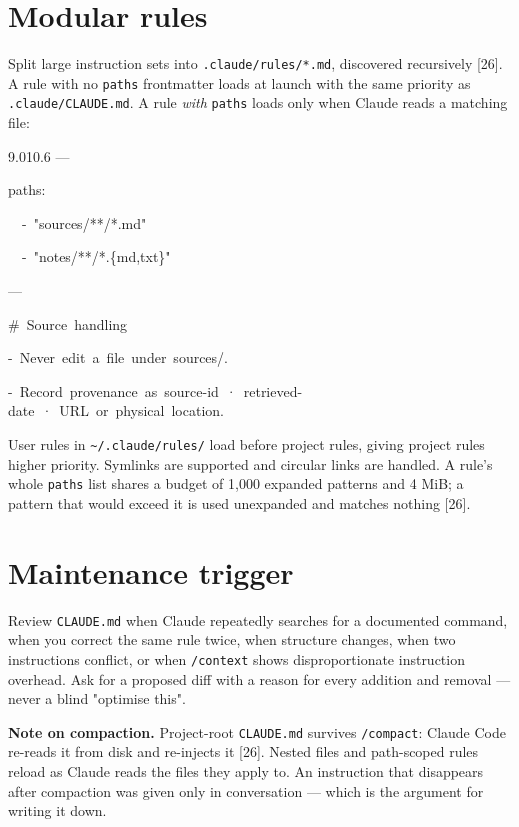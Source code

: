 \documentclass[11pt,a4paper,twoside,openany]{book}
\newcommand{\cl}[1]{\noindent\mbox{#1}\par}
\begin{document}
\FloatBarrier
\setcounter{section}{4}
\section{Modular rules}

Split large instruction sets into \texttt{.\allowbreak{}claude/\allowbreak{}rules/\allowbreak{}*.\allowbreak{}md}, discovered recursively [26]. A rule with no \texttt{paths} frontmatter loads at launch with the same priority as \texttt{.\allowbreak{}claude/\allowbreak{}CLAUDE.\allowbreak{}md}. A rule \emph{with} \texttt{paths} loads only when Claude reads a matching file:


\begin{codeblock}{9.0}{10.6}
\cl{---}
\cl{paths:}
\cl{~~-~"sources/**/*.md"}
\cl{~~-~"notes/**/*.\{md,txt\}"}
\cl{---}
\cl{}
\cl{\#~Source~handling}
\cl{}
\cl{-~Never~edit~a~file~under~\textasciigrave{}sources/\textasciigrave{}.}
\cl{-~Record~provenance~as~\textasciigrave{}source-id~·~retrieved-date~·~URL~or~physical~location\textasciigrave{}.}
\end{codeblock}

User rules in \texttt{\textasciitilde{}/\allowbreak{}.\allowbreak{}claude/\allowbreak{}rules/\allowbreak{}} load before project rules, giving project rules higher priority. Symlinks are supported and circular links are handled. A rule's whole \texttt{paths} list shares a budget of 1,000 expanded patterns and 4 MiB; a pattern that would exceed it is used unexpanded and matches nothing [26].


\FloatBarrier
\setcounter{section}{5}
\section{Maintenance trigger}

Review \texttt{CLAUDE.\allowbreak{}md} when Claude repeatedly searches for a documented command, when you correct the same rule twice, when structure changes, when two instructions conflict, or when \texttt{/\allowbreak{}context} shows disproportionate instruction overhead. Ask for a proposed diff with a reason for every addition and removal — never a blind "optimise this".


\textbf{Note on compaction.} Project-root \texttt{CLAUDE.\allowbreak{}md} survives \texttt{/\allowbreak{}compact}: Claude Code re-reads it from disk and re-injects it [26]. Nested files and path-scoped rules reload as Claude reads the files they apply to. An instruction that disappears after compaction was given only in conversation — which is the argument for writing it down.
\end{document}
